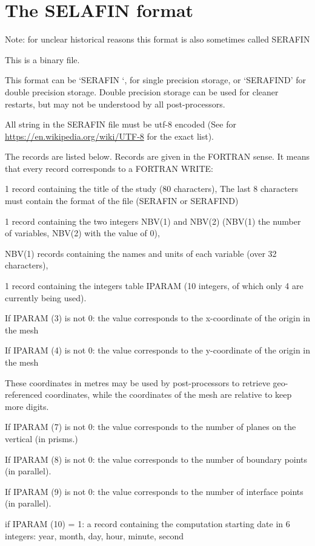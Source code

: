 \chapter{The SELAFIN format}\label{sec:srffmt}

Note: for unclear historical reasons this format is also sometimes called SERAFIN

This is a binary file.

This format can be `SERAFIN `, for single precision storage, or `SERAFIND' for
double precision storage.  Double precision storage can be used for cleaner
restarts, but may not be understood by all post-processors.

All string in the SERAFIN file must be utf-8 encoded (See for
\url{https://en.wikipedia.org/wiki/UTF-8} for the exact list).

The records are listed below. Records are given in the FORTRAN sense. It means
that every record corresponds to a FORTRAN WRITE:

1 record containing the title of the study (80 characters), The last 8
characters must contain the format of the file (SERAFIN or SERAFIND)

1 record containing the two integers NBV(1) and
NBV(2) (NBV(1) the number of variables, NBV(2)
with the value of 0),

NBV(1) records containing the names and units of each variable (over 32
characters),

1 record containing the integers table IPARAM (10 integers, of which only 4 are
currently being used).

If IPARAM (3) is not 0: the value corresponds to the x-coordinate of the origin
in the mesh

If IPARAM (4) is not 0: the value corresponds to the y-coordinate of the origin
in the mesh

These coordinates in metres may be used by post-processors to retrieve
geo-referenced coordinates, while the coordinates of the mesh are relative to
keep more digits.

If IPARAM (7) is not 0: the value corresponds to the number of planes on the
vertical (in prisms.)

If IPARAM (8) is not 0: the value corresponds to the number of boundary points
(in parallel).

If IPARAM (9) is not 0: the value corresponds to the number of interface points
(in parallel).

if IPARAM (10) = 1: a record containing the computation starting date in 6
integers: year, month, day, hour, minute, second

